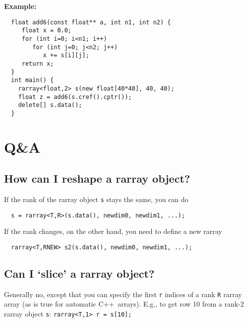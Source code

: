 \documentclass[12pt,twoside]{article}
\newcommand{\cxx}{C{++}}
\begin{document}
\noindent
{\bf Example:}
\vspace{-5pt}\begin{framed}\vspace{-14pt}%
\begin{verbatim}
  float add6(const float** a, int n1, int n2) {
     float x = 0.0;
     for (int i=0; i<n1; i++)
        for (int j=0; j<n2; j++)
           x += s[i][j];
     return x;
  }
  int main() {
    rarray<float,2> s(new float[40*40], 40, 40);
    float z = add6(s.cref().cptr());
    delete[] s.data();
  }
\end{verbatim}\vspace{-14pt}
\end{framed}

\section{Q\&A}


\subsection{How can I reshape a rarray object?}
If the rank of the rarray object \texttt{s} stays the same, you can do
\vspace{-5pt}\begin{framed}\vspace{-14pt}%
\begin{verbatim}
  s = rarray<T,R>(s.data(), newdim0, newdim1, ...);
\end{verbatim}\vspace{-14pt}
\end{framed}
If the rank changes, on the other hand, you need to define a new rarray
\vspace{-5pt}\begin{framed}\vspace{-14pt}%
\begin{verbatim}
  rarray<T,RNEW> s2(s.data(), newdim0, newdim1, ...);
\end{verbatim}\vspace{-14pt}
\end{framed}

\subsection{Can I `slice' a rarray object?}

Generally no, except that you can specify the first \texttt{r} indices of a rank \texttt{R} rarray
array (as is true for automatic \cxx\ arrays).
E.g., to get row 10 from a rank-2 rarray object \texttt{s}:
\texttt{rarray{\tt <}T,1{\tt >} r = s[10];}
\end{document}
